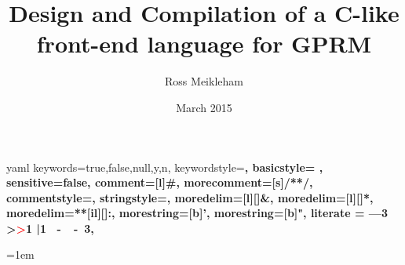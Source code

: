\documentclass{l4proj}
\begin{document}
\makeatletter

\newcommand\language@yaml{yaml}

\expandafter\expandafter\expandafter\lstdefinelanguage
\expandafter{\language@yaml}
{
  keywords={true,false,null,y,n},
  keywordstyle=\color{darkgray}\bfseries,
                basicstyle=%
                \ttfamily
                \lst@ifdisplaystyle\scriptsize\fi,
  sensitive=false,
  comment=[l]{\#},
  morecomment=[s]{/*}{*/},
  commentstyle=\color{purple}\ttfamily,
  stringstyle=\YAMLvaluestyle\ttfamily,
  moredelim=[l][\color{orange}]{\&},
  moredelim=[l][\color{magenta}]{*},
  moredelim=**[il][\YAMLcolonstyle{:}\YAMLvaluestyle]{:},   %
  morestring=[b]',
  morestring=[b]",
  literate =    {---}{{\ProcessThreeDashes}}3
                {>}{{\textcolor{red}\textgreater}}1     
                {|}{{\textcolor{red}\textbar}}1 
                {\ -\ }{{\mdseries\ -\ }}3,
}


\title{Design and Compilation of a C-like front-end language for GPRM}
\author{Ross Meikleham}
\date{March 2015}
\maketitle



\educationalconsent

\tableofcontents

\setlength{\parindent}{0pt}









\emergencystretch=1em
\raggedright


\end{document}
